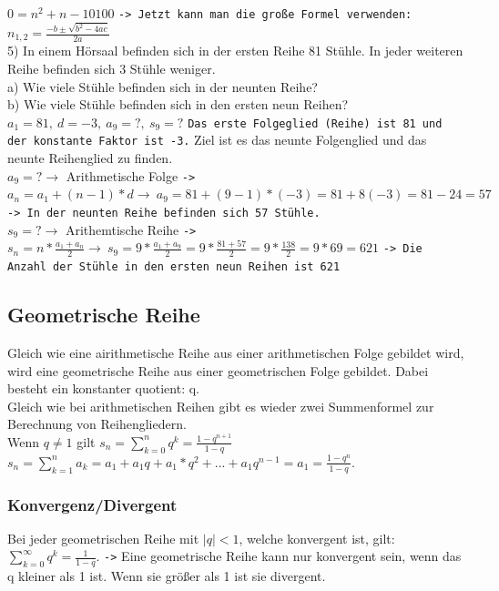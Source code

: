 \documentclass{article}
\begin{document}
	$0=n^2+n-10100$ \verb|-> Jetzt kann man die große Formel verwenden:| $n_{1,2}=\frac{-b\pm\sqrt{b^2-4ac}}{2a}$ \\
	5) In einem Hörsaal befinden sich in der ersten Reihe 81 Stühle. In jeder weiteren Reihe befinden sich 3 Stühle weniger. \\
	a) Wie viele Stühle befinden sich in der neunten Reihe? \\
	b) Wie viele Stühle befinden sich in den ersten neun Reihen? \\
	$a_1=81,\ d=-3,\ a_9=?,\ s_9=?$ \verb|Das erste Folgeglied (Reihe) ist 81 und der konstante Faktor ist -3.| Ziel ist es das neunte Folgenglied und das neunte Reihenglied zu finden. \\
	$a_9=?\to$ Arithmetische Folge \verb|->| $a_n=a_1+(n-1)*d\to\ a_9=81+(9-1)*(-3)=81+8(-3)=81-24=57$ \verb|-> In der neunten Reihe befinden sich 57 Stühle.|\\
	$s_9=?\to$ Arithemtische Reihe \verb|->| $s_n=n*\frac{a_1+a_n}{2}\to\ s_9=9*\frac{a_1+a_9}{2}=9*\frac{81+57}{2}=9*\frac{138}{2}=9*69=621$ \verb|-> Die Anzahl der Stühle in den ersten neun Reihen ist 621|	
	\subsection{Geometrische Reihe}
	Gleich wie eine airithmetische Reihe aus einer arithmetischen Folge gebildet wird, wird eine geometrische Reihe aus einer geometrischen Folge gebildet. Dabei besteht ein konstanter quotient: q. \\
	Gleich wie bei arithmetischen Reihen gibt es wieder zwei Summenformel zur Berechnung von Reihengliedern.\\
	Wenn $q\ne 1$ gilt $s_n=\sum^{n}_{k=0}{q^k}=\frac{1-q^{n+1}}{1-q}$\\
	$s_n=\sum^{n}_{k=1}a_k=a_1+a_1q+a_1*q^2+...+a_1q^{n-1}=a_1=\frac{1-q^n}{1-q}$. \\
	\subsubsection{Konvergenz/Divergent}
	Bei jeder geometrischen Reihe mit $|q|<1$, welche konvergent ist, gilt: $\sum^{\infty}_{k=0}q^k=\frac{1}{1-q}$. \verb|->| Eine geometrische Reihe kann nur konvergent sein, wenn das q kleiner als 1 ist. Wenn sie größer als 1 ist sie divergent.
\end{document}
